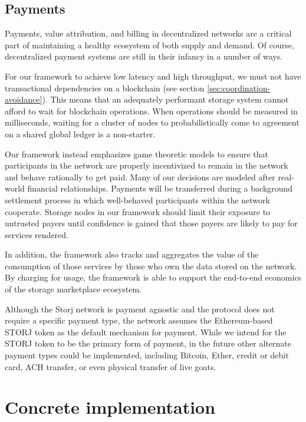 \documentclass[8pt,fleqn,openany]{book}
\begin{document}
\section{Payments}

Payments, value attribution, and billing in decentralized networks are a
critical part of maintaining a healthy
ecosystem of both supply and demand. Of course, decentralized payment systems
are still in their infancy in a number of ways.

For our framework to achieve low latency and high throughput, we must not have
transactional dependencies on a blockchain (see section \ref{sec:coordination-avoidance}).
This means that an adequately performant storage system cannot afford to
wait for blockchain operations. When operations should be measured in
milliseconds, waiting for a cluster of nodes to probabilistically come to
agreement on a shared global ledger is a non-starter.

Our framework instead emphasizes game theoretic models to ensure
that participants in the network are properly incentivized to remain in the
network and behave rationally to get paid.
Many of our decisions are modeled after real-world financial relationships.
Payments will be transferred during
a background settlement process in which well-behaved participants within
the network cooperate. Storage nodes in our framework should limit their exposure
to untrusted payers until confidence is gained that those payers are likely
to pay for services rendered.

In addition, the framework also tracks and aggregates the value of the
consumption of those services by those who own the data stored on the network.
By charging for usage, the framework is able to support the end-to-end
economics of the storage marketplace ecosystem.

Although the Storj network is payment agnostic and
the protocol does not require a specific payment type,
the network assumes the Ethereum-based STORJ token as the default mechanism
for payment. While we intend for the STORJ token to be the primary form of payment, in the future other alternate payment types could be implemented, including Bitcoin,
Ether, credit or debit card, ACH transfer, or even physical transfer of
live goats.

\chapter{Concrete implementation}\label{chap:concrete}
\end{document}
